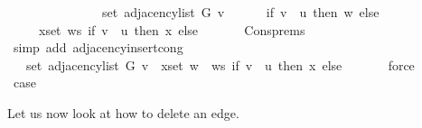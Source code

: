 \begin{isabellebody}
\ \ \isamarkupfalse%
\ \isamarkupfalse%
\isanewline
\ \ \ \ {\isachardoublequoteopen}{\isachardot}{\kern0pt}{\isachardot}{\kern0pt}{\isachardot}{\kern0pt}\ {\isacharequal}{\kern0pt}\isanewline
\ \ \ \ \ set\ {\isacharparenleft}{\kern0pt}adjacency{\isacharunderscore}{\kern0pt}list\ G\ v{\isacharparenright}{\kern0pt}\ {\isasymunion}\isanewline
\ \ \ \ \ {\isacharparenleft}{\kern0pt}if\ v\ {\isacharequal}{\kern0pt}\ u\ then\ {\isacharbraceleft}{\kern0pt}w{\isacharbraceright}{\kern0pt}\ else\ {\isacharbraceleft}{\kern0pt}{\isacharbraceright}{\kern0pt}{\isacharparenright}{\kern0pt}\ {\isasymunion}\isanewline
\ \ \ \ \ {\isacharparenleft}{\kern0pt}{\isasymUnion}x{\isasymin}set\ ws{\isachardot}{\kern0pt}\ if\ v\ {\isacharequal}{\kern0pt}\ u\ then\ {\isacharbraceleft}{\kern0pt}x{\isacharbraceright}{\kern0pt}\ else\ {\isacharbraceleft}{\kern0pt}{\isacharbraceright}{\kern0pt}{\isacharparenright}{\kern0pt}{\isachardoublequoteclose}\isanewline
\ \ \ \ \isamarkupfalse%
\ Cons{\isachardot}{\kern0pt}prems\isanewline
\ \ \ \ \isamarkupfalse%
\ {\isacharparenleft}{\kern0pt}simp\ add{\isacharcolon}{\kern0pt}\ adjacency{\isacharunderscore}{\kern0pt}insert{\isacharprime}{\kern0pt}{\isacharunderscore}{\kern0pt}cong{\isacharparenright}{\kern0pt}\isanewline
\ \ \isamarkupfalse%
\ \isamarkupfalse%
\ {\isachardoublequoteopen}{\isachardot}{\kern0pt}{\isachardot}{\kern0pt}{\isachardot}{\kern0pt}\ {\isacharequal}{\kern0pt}\ set\ {\isacharparenleft}{\kern0pt}adjacency{\isacharunderscore}{\kern0pt}list\ G\ v{\isacharparenright}{\kern0pt}\ {\isasymunion}\ {\isacharparenleft}{\kern0pt}{\isasymUnion}x{\isasymin}set\ {\isacharparenleft}{\kern0pt}w\ {\isacharhash}{\kern0pt}\ ws{\isacharparenright}{\kern0pt}{\isachardot}{\kern0pt}\ if\ v\ {\isacharequal}{\kern0pt}\ u\ then\ {\isacharbraceleft}{\kern0pt}x{\isacharbraceright}{\kern0pt}\ else\ {\isacharbraceleft}{\kern0pt}{\isacharbraceright}{\kern0pt}{\isacharparenright}{\kern0pt}{\isachardoublequoteclose}\isanewline
\ \ \ \ \isamarkupfalse%
\ force\isanewline
\ \ \isamarkupfalse%
\ \isamarkupfalse%
\ {\isacharquery}{\kern0pt}case\isanewline
\ \ \ \ \isacommand{{\isachardot}{\kern0pt}}\isamarkupfalse%
\isanewline
{}\isamarkupfalse%
%
\endisatagproof
{\isafoldproof}%
%
\isadelimproof
%
\endisadelimproof
%
\begin{isamarkuptext}%
Let us now look at how to delete an edge.%
\end{isamarkuptext}\isamarkuptrue%

\end{isabellebody}
